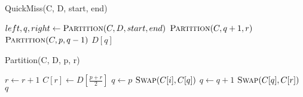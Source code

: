\documentclass[11pt]{article}
\begin{document}
\begin{algorithm}
\caption{QuickMiss(C, D, start, end)}\label{QuickMiss}
    \begin{algorithmic}[1]
            \State $left, q, right \gets \textsc{Partition}(C, D, start, end)$
                \State $\textsc{Partition}(C, q+1, r)$
                \State $\textsc{Partition}(C, p, q-1)$
            \Else
                \State \Return $D[q]$
            \EndIf
        \EndIf
        \EndProcedure
    \end{algorithmic}
\end{algorithm}


\begin{algorithm}
\caption{Partition(C, D, p, r)}\label{Partition}
    \begin{algorithmic}[1]
        \State $r \gets r+1$
        \State $C[r] \gets D[\frac{p+r}{2}]$
        \State $q \gets p$
                \State $\textsc{Swap}(C[i], C[q])$
                \State $q \gets q+1$
            \EndIf
        \EndFor
        \State $\textsc{Swap}(C[q], C[r])$
        \State \Return $q$
        \EndProcedure
    \end{algorithmic}
\end{algorithm}

%
% 
% 
\end{document}
